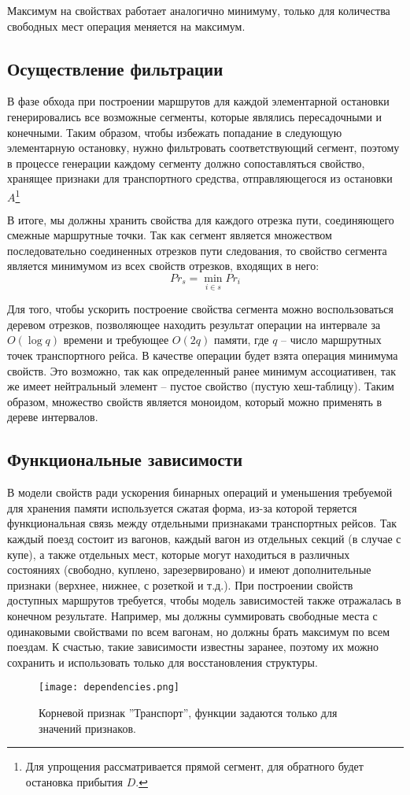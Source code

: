 Максимум на свойствах работает аналогично минимуму, только для количества свободных мест операция меняется на максимум.

\subsection{Осуществление фильтрации}
В фазе обхода при построении маршрутов для каждой элементарной остановки генерировались все возможные сегменты, которые являлись пересадочными и конечными. Таким образом, чтобы избежать попадание в следующую элементарную остановку, нужно фильтровать соответствующий сегмент, поэтому в процессе генерации каждому сегменту должно сопоставляться свойство, хранящее признаки для транспортного средства, отправляющегося из остановки $A$\footnote{Для упрощения рассматривается прямой сегмент, для обратного будет остановка прибытия $D$.}

В итоге, мы должны хранить свойства для каждого отрезка пути, соединяющего смежные маршрутные точки. Так как сегмент является множеством последовательно соединенных отрезков пути следования, то свойство сегмента является минимумом из всех свойств отрезков, входящих в него:
\[
Pr_s=\min_{i \in s}{Pr_i}
\]

Для того, чтобы ускорить построение свойства сегмента можно воспользоваться деревом отрезков, позволяющее находить результат операции на интервале за $O(\log q)$ времени и требующее $O(2q)$ памяти, где $q$ -- число маршрутных точек транспортного рейса. В качестве операции будет взята операция минимума свойств. Это возможно, так как определенный ранее минимум ассоциативен, так же имеет нейтральный элемент -- пустое свойство (пустую хеш-таблицу). Таким образом, множество свойств является моноидом, который можно применять в дереве интервалов.

\subsection{Функциональные зависимости}
В модели свойств ради ускорения бинарных операций и уменьшения требуемой для хранения памяти используется сжатая форма, из-за которой теряется функциональная связь между отдельными признаками транспортных рейсов. Так каждый поезд состоит из вагонов, каждый вагон из отдельных секций (в случае с купе), а также отдельных мест, которые могут находиться в различных состояниях (свободно, куплено, зарезервировано) и имеют дополнительные признаки (верхнее, нижнее, с розеткой и т.д.). При построении свойств доступных маршрутов требуется, чтобы модель зависимостей также отражалась в конечном результате. Например, мы должны суммировать свободные места с одинаковыми свойствами по всем вагонам, но должны брать максимум по всем поездам. К счастью, такие зависимости известны заранее, поэтому их можно сохранить и использовать только для восстановления структуры.

\begin{figure}[!h]
	\centering
	\texttt{[image: dependencies.png]}
	\caption{Корневой признак ''Транспорт'', функции задаются только для значений признаков.}\label{fig8}
\end{figure}

\chapterconclusion